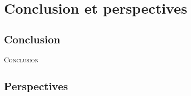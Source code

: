 

\graphicspath{{5_Images/9_Conclusion/}}                         %
\makeatletter
{}                       %
\makeatother

\chapter*{Conclusion et perspectives}\label{Chap:Conclusion}    %

\mtcaddchapter%
{}      %


\section*{Conclusion}

\lettrine{C}{onclusion} \lipsum[1-4]%

\section*{Perspectives}

\lipsum[1-4]%